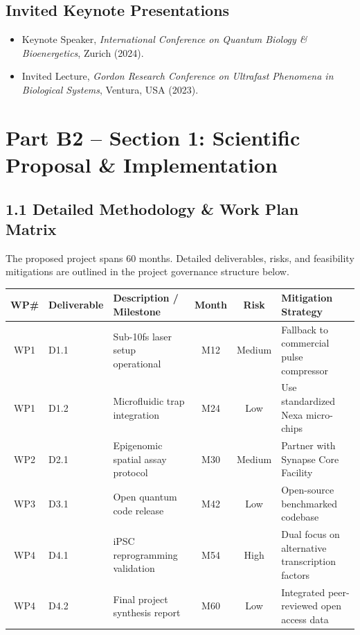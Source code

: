 \documentclass[11pt,a4paper]{article}
\begin{document}
\subsection*{Invited Keynote Presentations}
\begin{itemize}[leftmargin=1.5em, itemsep=2pt]
  \item Keynote Speaker, \textit{International Conference on Quantum Biology \& Bioenergetics}, Zurich (2024).
  \item Invited Lecture, \textit{Gordon Research Conference on Ultrafast Phenomena in Biological Systems}, Ventura, USA (2023).
\end{itemize}

\newpage

\section*{Part B2 -- Section 1: Scientific Proposal \& Implementation}

\subsection*{1.1 Detailed Methodology \& Work Plan Matrix}
The proposed project spans 60 months. Detailed deliverables, risks, and feasibility mitigations are outlined in the project governance structure below.

\vspace{6pt}
\small
{}
\begin{tabularx}{\textwidth}{@{}c l X c c l@{}}
  \toprule
  \textbf{WP\#} & \textbf{Deliverable} & \textbf{Description / Milestone} & \textbf{Month} & \textbf{Risk} & \textbf{Mitigation Strategy} \\
  \midrule
  WP1 & D1.1 & Sub-10fs laser setup operational & M12 & Medium & Fallback to commercial pulse compressor \\
  WP1 & D1.2 & Microfluidic trap integration & M24 & Low & Use standardized Nexa micro-chips \\
  WP2 & D2.1 & Epigenomic spatial assay protocol & M30 & Medium & Partner with Synapse Core Facility \\
  WP3 & D3.1 & Open quantum code release & M42 & Low & Open-source benchmarked codebase \\
  WP4 & D4.1 & iPSC reprogramming validation & M54 & High & Dual focus on alternative transcription factors \\
  WP4 & D4.2 & Final project synthesis report & M60 & Low & Integrated peer-reviewed open access data \\
  \bottomrule
\end{tabularx}
\normalsize
\end{document}
